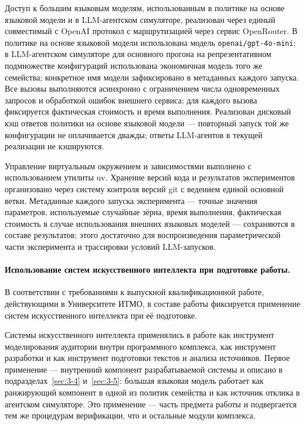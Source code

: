 Доступ к большим языковым моделям, использованным в политике на основе языковой модели и в LLM-агентском симуляторе, реализован через единый совместимый с OpenAI протокол с маршрутизацией через сервис OpenRouter. В политике на основе языковой модели использована модель \texttt{openai/gpt-4o-mini}; в LLM-агентском симуляторе для основного прогона на репрезентативном подмножестве конфигураций использована экономичная модель того же семейства; конкретное имя модели зафиксировано в метаданных каждого запуска. Все вызовы выполняются асинхронно с ограничением числа одновременных запросов и обработкой ошибок внешнего сервиса; для каждого вызова фиксируется фактическая стоимость и время выполнения. Реализован дисковый кэш ответов политики на основе языковой модели --- повторный запуск той же конфигурации не оплачивается дважды; ответы LLM-агентов в текущей реализации не кэшируются.

Управление виртуальным окружением и зависимостями выполнено с использованием утилиты uv. Хранение версий кода и результатов экспериментов организовано через систему контроля версий git с ведением единой основной ветки. Метаданные каждого запуска эксперимента --- точные значения параметров, используемые случайные зёрна, время выполнения, фактическая стоимость в случае использования внешних языковых моделей --- сохраняются в составе результатов; этого достаточно для воспроизведения параметрической части эксперимента и трассировки условий LLM-запусков.

\paragraph{Использование систем искусственного интеллекта при подготовке работы.}
В соответствии с требованиями к выпускной квалификационной работе, действующими в Университете ИТМО, в составе работы фиксируется применение систем искусственного интеллекта при её подготовке.

Системы искусственного интеллекта применялись в работе как инструмент моделирования аудитории внутри программного комплекса, как инструмент разработки и как инструмент подготовки текстов и анализа источников. Первое применение --- внутренний компонент разрабатываемой системы и описано в подразделах~\ref{sec:3-4} и~\ref{sec:3-5}: большая языковая модель работает как ранжирующий компонент в одной из политик семейства и как источник отклика в агентском симуляторе. Это применение --- часть предмета работы и подвергается тем же процедурам верификации, что и остальные модули комплекса.

